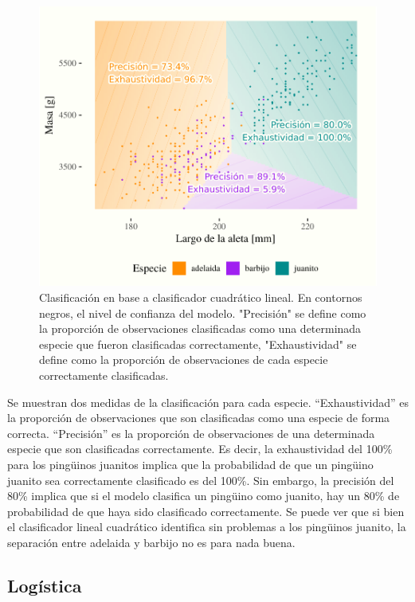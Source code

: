 \documentclass[]{tufte-handout}
\begin{document}
\begin{figure}
\includegraphics{TP-Labo-2_files/figure-latex/cuadratico-2} \caption[Clasificación en base a clasificador cuadrático lineal]{Clasificación en base a clasificador cuadrático lineal. En contornos negros, el nivel de confianza del modelo. "Precisión" se define como la proporción de observaciones clasificadas como una determinada especie que fueron clasificadas correctamente, "Exhaustividad" se define como la proporción de observaciones de cada especie correctamente clasificadas.}\label{fig:cuadratico}
\end{figure}

Se muestran dos medidas de la clasificación para cada especie. ``Exhaustividad'' es la proporción de observaciones que son clasificadas como una especie de forma correcta. ``Precisión'' es la proporción de observaciones de una determinada especie que son clasificadas correctamente. Es decir, la exhaustividad del 100\% para los pingüinos juanitos implica que la probabilidad de que un pingüino juanito sea correctamente clasificado es del 100\%. Sin embargo, la precisión del 80\% implica que si el modelo clasifica un pingüino como juanito, hay un 80\% de probabilidad de que haya sido clasificado correctamente.
Se puede ver que si bien el clasificador lineal cuadrático identifica sin problemas a los pingüinos juanito, la separación entre adelaida y barbijo no es para nada buena.

\hypertarget{loguxedstica}{%
\subsection{Logística}\label{loguxedstica}}
\end{document}
